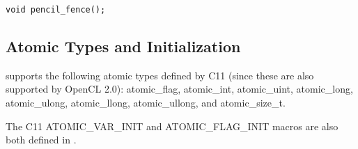 \lstinline!void pencil_fence();!


\subsection{Atomic Types and Initialization}
\pencil supports the following atomic types defined by C11 (since these are
also supported by OpenCL 2.0):
atomic_flag, atomic_int, atomic_uint, atomic_long, atomic_ulong, atomic_llong,
atomic_ullong, and atomic_size_t.

The C11 ATOMIC_VAR_INIT and ATOMIC_FLAG_INIT macros are also both defined
in \pencil.


